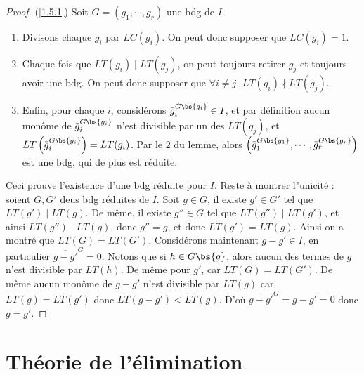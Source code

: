             \begin{proof} (\ref{1.5.1})
                Soit $G = (g_1, \cdots, g_r)$ une bdg de $I$.
                \begin{enumerate}
                    \item Divisons chaque $g_i$ par $LC(g_i)$. On peut donc supposer que $LC(g_i) = 1$.
                    \item Chaque fois que $LT(g_i) \mid LT(g_j)$, on peut toujours retirer $g_j$ et toujours avoir une bdg. On peut donc supposer que $\forall i \neq j$, $LT(g_i) \nmid LT(g_j)$.
                    \item Enfin, pour chaque $i$, considérons $\bar g_i^{G \bs \{g_i\}} \in I$, et par définition aucun monôme de $\bar g_i^{G \bs \{g_i\}}$ n'est divisible par un des $LT(g_j)$, et $LT\left(\bar g_i^{G \bs \{g_i\}}\right) = LT(g_i)$. Par le $2$ du lemme, alors $\left(\bar g_1^{G \bs \{g_1\}}, \cdots, \bar g_r^{G \bs \{g_r\}}\right)$ est une bdg, qui de plus est réduite.
                \end{enumerate}
                Ceci prouve l'existence d'une bdg réduite pour $I$. Reste à montrer l"unicité : soient $G,G'$ deus bdg réduites de $I$. Soit $g \in G$, il existe $g' \in G'$ tel que $LT(g') \mid LT(g)$. De même, il existe $g'' \in G$ tel que $LT(g'') \mid LT(g')$, et ainsi $LT(g'') \mid LT(g)$, donc $g'' = g$, et donc $LT(g') = LT(g)$. Ainsi on a montré que $LT(G) = LT(G')$. Considérons maintenant $g - g' \in I$, en particulier $\overline{g - g'}^G = 0$. Notons que si $h \in G \bs \{g\}$, alors aucun des termes de $g$ n'est divisible par $LT(h)$. De même pour $g'$, car $LT(G) = LT(G')$. De même aucun monôme de $g - g'$ n'est divisible par $LT(g)$ car $LT(g) = LT(g')$ donc $LT(g - g') < LT(g)$. D'où $\overline{g - g'}^G = g- g' = 0$ donc $g = g'$.
            \end{proof}

    \section{Théorie de l'élimination}
